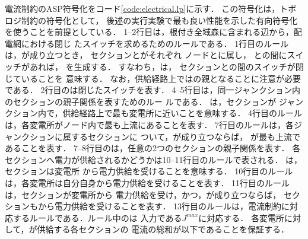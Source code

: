 電流制約のASP符号化をコード\ref{code:electrical.lp}に示す．
この符号化は，トポロジ制約の符号化として，
後述の実行実験で最も良い性能を示した有向符号化を使うことを前提としている．
% 
1--2行目は，根付き全域森に含まれる辺から，配電網における閉じ
たスイッチを求めるためのルールである．
1行目のルールは，が成り立つとき，
セクションとがそれぞれ
ノードとに属し，
との間にスイッチがあれば，
を生成する．
すなわち，は，
セクションとの間のスイッチが閉じていることを
意味する．
なお，供給経路上ではの親となることに注意が必要である．
2行目のは閉じたスイッチを表す．
%
4--5行目は，同一ジャンクション内のセクションの親子関係を表すためのルー
ルである．
は，セクションが
ジャンクション内で，供給経路上で最も変電所に近いことを意味する．
4行目のルールは，各変電所がノード内で最も上流にあることを表す．
7行目のルールは，各ジャンクションに属するセクションに
ついて，が成り立つならば，
が最も上流であることを表す．
%
7--8行目のは，任意の2つのセクションの親子関係を表す．
%
各セクションへ電力が供給されるかどうかは10--11行目のルールで表される．
は，セクションは変電所
から電力供給を受けることを意味する．
10行目のルールは，各変電所は自分自身から電力供給を受けることを表す．
11行目のルールは，セクションが変電所から
電力供給を受け，かつ，が成り立つならば，
セクションもから電力供給を受けることを表す．
%
13行目のルールは，電流制約に対応するルールである．ルール中のは
入力である$J^{max}$に対応する．
各変電所に対して，が供給する各セクションの
電流の総和が以下であることを保証する．


